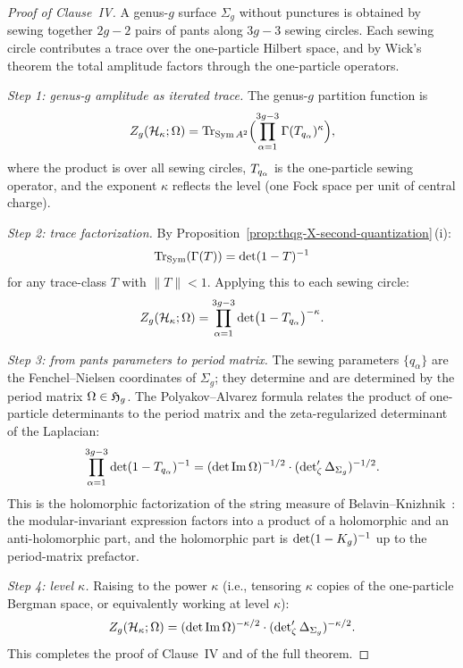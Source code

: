 \begin{proof}[Proof of Clause~IV]
A genus-$g$ surface $\Sigma_g$ without punctures is obtained by
sewing together $2g-2$ pairs of pants along $3g-3$ sewing circles.
Each sewing circle contributes a trace over the one-particle
Hilbert space, and by Wick's theorem the total amplitude factors
through the one-particle operators.

\emph{Step 1: genus-$g$ amplitude as iterated trace.}
The genus-$g$ partition function is
\begin{equation}\label{eq:thqg-X-genus-g-trace}
Z_g(\mathcal{H}_\kappa; \Omega)
= \operatorname{Tr}_{\operatorname{Sym} A^2}
\Bigl(\prod_{\alpha=1}^{3g-3}
\Gamma(T_{q_\alpha})^{\kappa}\Bigr),
\end{equation}
where the product is over all sewing circles, $T_{q_\alpha}$
is the one-particle sewing operator, and the exponent $\kappa$
reflects the level (one Fock space per unit of central charge).

\emph{Step 2: trace factorization.}
By Proposition~\ref{prop:thqg-X-second-quantization}\,(i):
\[
\operatorname{Tr}_{\operatorname{Sym}}(\Gamma(T))
= \det(1 - T)^{-1}
\]
for any trace-class $T$ with $\|T\| < 1$. Applying this to each
sewing circle:
\begin{equation}\label{eq:thqg-X-genus-g-det}
Z_g(\mathcal{H}_\kappa; \Omega)
= \prod_{\alpha=1}^{3g-3}
\det\bigl(1 - T_{q_\alpha}\bigr)^{-\kappa}.
\end{equation}

\emph{Step 3: from pants parameters to period matrix.}
The sewing parameters $\{q_\alpha\}$ are the Fenchel--Nielsen
coordinates of $\Sigma_g$; they determine and are determined by
the period matrix $\Omega \in \mathfrak{H}_g$. The Polyakov--Alvarez
formula \cite{BK86} relates the product of one-particle
determinants to the period matrix and the zeta-regularized
determinant of the Laplacian:
\begin{equation}\label{eq:thqg-X-polyakov}
\prod_{\alpha=1}^{3g-3}
\det(1 - T_{q_\alpha})^{-1}
= (\det\operatorname{Im}\Omega)^{-1/2}
\cdot (\det\nolimits'_\zeta\Delta_{\Sigma_g})^{-1/2}.
\end{equation}
This is the holomorphic factorization of the string measure
of Belavin--Knizhnik~\cite{BK86}: the modular-invariant
expression factors into a product of a holomorphic and an
anti-holomorphic part, and the holomorphic part is
$\det(1 - K_g)^{-1}$ up to the period-matrix prefactor.

\emph{Step 4: level $\kappa$.}
Raising to the power $\kappa$ (i.e., tensoring $\kappa$ copies
of the one-particle Bergman space, or equivalently working at
level $\kappa$):
\begin{equation}\label{eq:thqg-X-final-fredholm}
Z_g(\mathcal{H}_\kappa; \Omega)
= (\det\operatorname{Im}\Omega)^{-\kappa/2}
\cdot (\det\nolimits'_\zeta\Delta_{\Sigma_g})^{-\kappa/2}.
\end{equation}
This completes the proof of Clause~IV and of the full theorem.
\end{proof}

